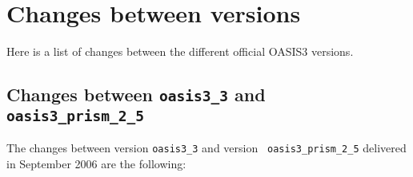 \newpage

\chapter{Changes between versions}
\label{sec_changes}

Here is a list of changes between the different official OASIS3
versions.

\section{Changes between {\tt oasis3\_3} and {\tt
oasis3\_prism\_2\_5}}

The changes between version {\tt oasis3\_3} and version {\tt
  oasis3\_prism\_2\_5} delivered in September 2006 are the following:

